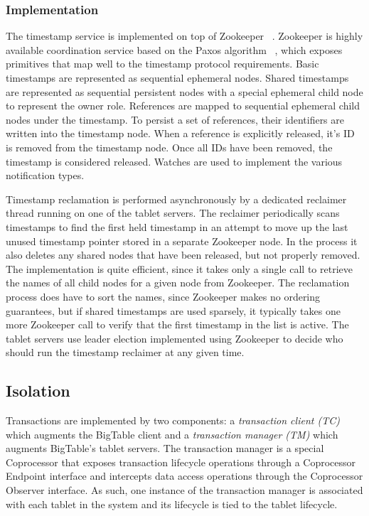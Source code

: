 \documentclass[10pt,final,journal]{IEEEtran}
\begin{document}
\subsubsection{Implementation}
The timestamp service is implemented on top of Zookeeper ~\cite{Hunt:2010:ZWC:1855840.1855851}. Zookeeper is highly available coordination service based on the Paxos algorithm ~\cite{Lamport:1998:PP:279227.279229, Lamport:2001:PMS}, which exposes primitives that map well to the timestamp protocol requirements. Basic timestamps are represented as sequential ephemeral nodes. Shared timestamps are represented as sequential persistent nodes with a special ephemeral child node to represent the owner role. References are mapped to sequential ephemeral child nodes under the timestamp. To persist a set of references, their identifiers are written into the timestamp node. When a reference is explicitly released, it's ID is removed from the timestamp node. Once all IDs have been removed, the timestamp is considered released. Watches are used to implement the various notification types.

Timestamp reclamation is performed asynchronously by a dedicated reclaimer thread running on one of the tablet servers. The reclaimer periodically scans timestamps to find the first held timestamp in an attempt to move up the last unused timestamp pointer stored in a separate Zookeeper node. In the process it also deletes any shared nodes that have been released, but not properly removed. The implementation is quite efficient, since it takes only a single call to retrieve the names of all child nodes for a given node from Zookeeper. The reclamation process does have to sort the names, since Zookeeper makes no ordering guarantees, but if shared timestamps are used sparsely, it typically takes one more Zookeeper call to verify that the first timestamp in the list is active. The tablet servers use leader election implemented using Zookeeper to decide who should run the timestamp reclaimer at any given time.

\subsection{Isolation}
Transactions are implemented by two components: a \emph{transaction client (TC)} which augments the BigTable client and a \emph{transaction manager (TM)} which augments BigTable's tablet servers. The transaction manager is a special Coprocessor that exposes transaction lifecycle operations through a Coprocessor Endpoint interface and intercepts data access operations through the Coprocessor Observer interface. As such, one instance of the transaction manager is associated with each tablet in the system and its lifecycle is tied to the tablet lifecycle.
\end{document}
